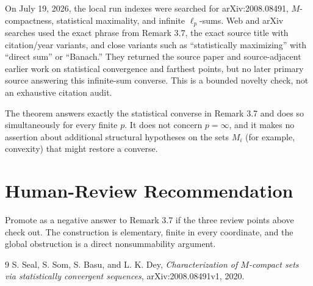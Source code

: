 \documentclass[11pt]{article}
\begin{document}
On July 19, 2026, the local run indexes were searched for arXiv:2008.08491,
$M$-compactness, statistical maximality, and infinite $\ell_p$-sums.  Web and
arXiv searches used the exact phrase from Remark 3.7, the exact source title
with citation/year variants, and close variants such as ``statistically
maximizing'' with ``direct sum'' or ``Banach.''  They returned the source
paper and source-adjacent earlier work on statistical convergence and
farthest points, but no later primary source answering this infinite-sum
converse.  This is a bounded novelty check, not an exhaustive citation audit.

The theorem answers exactly the statistical converse in Remark 3.7 and does
so simultaneously for every finite $p$.  It does not concern $p=\infty$, and
it makes no assertion about additional structural hypotheses on the sets
$M_i$ (for example, convexity) that might restore a converse.

\section*{Human-Review Recommendation}

Promote as a negative answer to Remark 3.7 if the three review points above
check out.  The construction is elementary, finite in every coordinate, and
the global obstruction is a direct nonsummability argument.

\begin{thebibliography}{9}
S. Seal, S. Som, S. Basu, and L. K. Dey,
\emph{Characterization of $M$-compact sets via statistically convergent
sequences}, arXiv:2008.08491v1, 2020.
\end{thebibliography}
\end{document}
